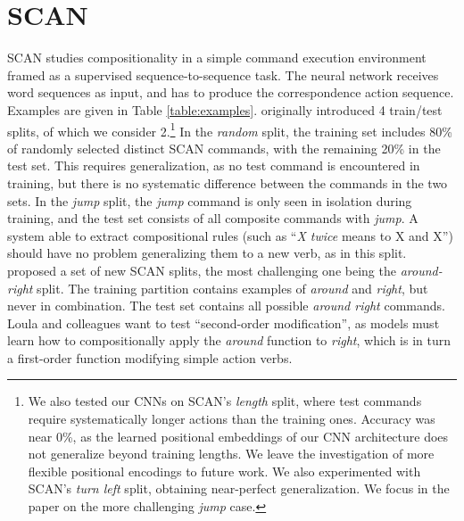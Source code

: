 \section{SCAN}
\label{sec:setup}

SCAN studies compositionality in a simple command
execution environment framed as a supervised sequence-to-sequence
task. The neural network receives word sequences as input, and has to
produce the correspondence action sequence. Examples are
given in Table \ref{table:examples}.
   originally introduced 4
train/test splits, of which we consider 2.\footnote{We also
  tested our CNNs on SCAN's \emph{length} split, where test commands
  require systematically longer actions than the training
  ones. Accuracy was near 0\%, as the learned positional
  embeddings of our CNN architecture does not 
  generalize beyond  training lengths. We leave the
  investigation of more flexible positional encodings \cite[as in,
  e.g.,][]{vaswani:etal:2017} to future work. We also experimented
  with SCAN's \emph{turn left} split, obtaining near-perfect
  generalization. We focus in the paper on the more challenging
  \emph{jump} case.} In the \emph{random} split, the training set
includes 80\% of randomly selected distinct SCAN commands, with the
remaining 20\% in the test set. This requires generalization,
as no test command is encountered in training, but there is no
systematic difference between the commands in the two sets.  In the
\emph{jump} split, the \emph{jump} command is only seen in isolation
during training, and the test set consists of all composite commands
with \emph{jump}. A system able to extract compositional rules (such
as ``\emph{X twice} means to X and X'') should have no problem
generalizing them to a new verb, as in this
split.  proposed a set of new SCAN splits,
the most challenging one being the \emph{around-right}
split.  The training partition contains examples of \emph{around} and
\emph{right}, but never in combination. The test set
contains all possible \emph{around right} commands. Loula and
colleagues want to test ``second-order modification'', as models
must learn how to compositionally apply the \emph{around}
function to \emph{right}, which is in turn a first-order function
modifying simple action verbs.%

